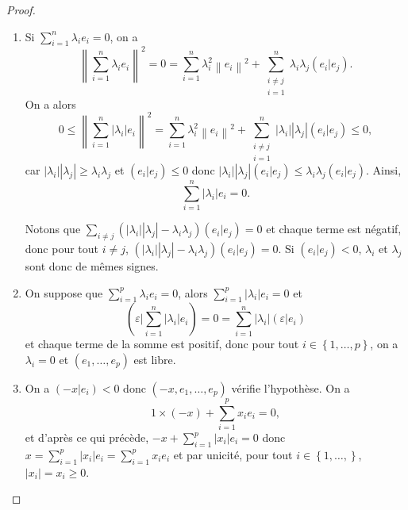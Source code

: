 \documentclass[12pt]{article}
\begin{document}
\begin{proof}
	\phantom{}
	\begin{enumerate}
		\item Si $\sum_{i=1}^{n}\lambda_i e_i=0$, on a 
		\begin{equation}
			\left\lVert\sum_{i=1}^{n}\lambda_i e_i\right\rVert^{2}=0=\sum_{i=1}^{n}\lambda_i^{2}\left\lVert e_i\right\rVert^{2}+\sum_{\substack{i\neq j\\i=1}}^{n}\lambda_i \lambda_j(e_i|e_j).
		\end{equation}
		On a alors 
		\begin{equation}
			0\leqslant\left\lVert\sum_{i=1}^{n}\left\lvert\lambda_i\right\rvert e_i\right\rVert^{2}=\sum_{i=1}^{n}\lambda_{i}^{2}\left\lVert e_i\right\rVert^{2}+\sum_{\substack{i\neq j\\ i=1}}^{n}\left\lvert \lambda_i\right\rvert\left\lvert \lambda_j\right\rvert(e_i|e_j)\leqslant0,
		\end{equation}
		car $\left\lvert\lambda_i\right\rvert\left\lvert\lambda_j\right\rvert\geqslant\lambda_i\lambda_j$ et $(e_i|e_j)\leqslant0$ donc $\left\lvert\lambda_i\right\rvert\left\lvert\lambda_j\right\rvert(e_i|e_j)\leqslant\lambda_i\lambda_j(e_i|e_j)$. Ainsi, 
		\begin{equation*}
			\sum_{i=1}^{n}\left\lvert\lambda_i\right\rvert e_i=0.
		\end{equation*}

		Notons que $\sum_{i\neq j}\left(\left\lvert\lambda_i\right\rvert\left\lvert\lambda_j\right\rvert-\lambda_i\lambda_j\right)(e_i|e_j)=0$ et chaque terme est négatif, donc pour tout $i\neq j$, $\left(\left\lvert\lambda_i\right\rvert\left\lvert\lambda_j\right\rvert-\lambda_i\lambda_j\right)(e_i|e_j)=0$. Si $(e_i|e_j)<0$, $\lambda_i$ et $\lambda_j$ sont donc de mêmes signes.

		\item On suppose que $\sum_{i=1}^{p}\lambda_i e_i=0$, alors $\sum_{i=1}^{p}\left\lvert \lambda_i\right\rvert e_i=0$ et 
		\begin{equation*}
			(\varepsilon|\sum_{i=1}^{n}\left\lvert \lambda_i\right\rvert e_i)=0=\sum_{i=1}^{n}\left\lvert\lambda_i\right\rvert(\varepsilon|e_i)
		\end{equation*}et chaque terme de la somme est positif, donc pour tout $i\in\left\lbrace1,\dots,p\right\rbrace$, on a $\lambda_i=0$ et $(e_1,\dots,e_p)$ est libre.
		
		\item On a $(-x|e_i)<0$ donc $(-x,e_1,\dots,e_p)$ vérifie l'hypothèse. On a 
		\begin{equation*}
			1\times(-x)+\sum_{i=1}^{p}x_i e_i=0,
		\end{equation*}et d'après ce qui précède, $-x+\sum_{i=1}^{p}\left\lvert x_i\right\rvert e_i=0$ donc $x=\sum_{i=1}^{p}\left\lvert x_i\right\rvert e_i=\sum_{i=1}^{p}x_i e_i$ et par unicité, pour tout $i\in\left\lbrace1,\dots,\right\rbrace$, $\left\lvert x_i\right\rvert=x_i\geqslant0$.
		

\end{enumerate}
\end{proof}
\end{document}
